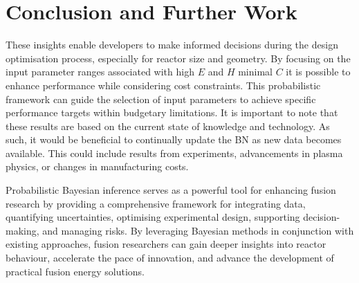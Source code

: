 \documentclass[journal]{IEEEtran}
\begin{document}


\section{Conclusion and Further Work}\label{sec:conc}

These insights enable developers to make informed decisions during the design optimisation process, especially for reactor size and geometry. By focusing on the input parameter ranges associated with high $E$ and $H$ minimal $C$ it is possible to enhance performance while considering cost constraints. This probabilistic framework can guide the selection of input parameters to achieve specific performance targets within budgetary limitations. It is important to note that these results are based on the current state of knowledge and technology. As such, it would be beneficial to continually update the BN as new data becomes available. This could include results from experiments, advancements in plasma physics, or changes in manufacturing costs.

Probabilistic Bayesian inference serves as a powerful tool for enhancing fusion research by providing a comprehensive framework for integrating data, quantifying uncertainties, optimising experimental design, supporting decision-making, and managing risks. By leveraging Bayesian methods in conjunction with existing approaches, fusion researchers can gain deeper insights into reactor behaviour, accelerate the pace of innovation, and advance the development of practical fusion energy solutions.
\end{document}
